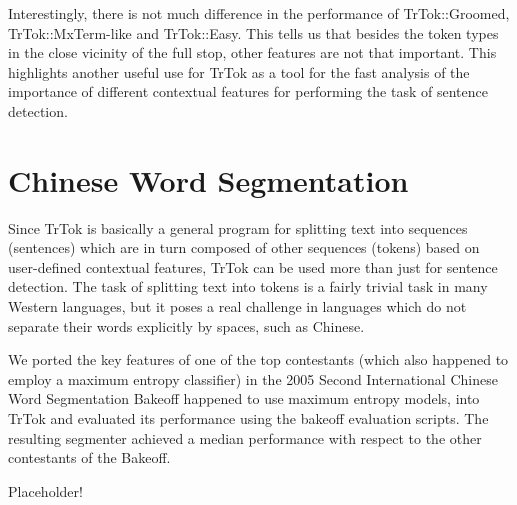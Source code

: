 Interestingly, there is not much difference in the performance of
TrTok::Groomed, TrTok::MxTerm-like and TrTok::Easy. This tells us that
besides the token types in the close vicinity of the full stop, other
features are not that important. This highlights another useful use
for TrTok as a tool for the fast analysis of the importance of
different contextual features for performing the task of sentence
detection.

\section{Chinese Word Segmentation}

Since TrTok is basically a general program for splitting text into
sequences (sentences) which are in turn composed of other sequences
(tokens) based on user-defined contextual features, TrTok can be used
more than just for sentence detection. The task of splitting text into
tokens is a fairly trivial task in many Western languages, but it
poses a real challenge in languages which do not separate their words
explicitly by spaces, such as Chinese.

We ported the key features of one of the top contestants (which also
happened to employ a maximum entropy classifier) in the 2005 Second
International Chinese Word Segmentation Bakeoff happened to use
maximum entropy models, into TrTok and evaluated its performance using
the bakeoff evaluation scripts. The resulting segmenter achieved a
median performance with respect to the other contestants of the
Bakeoff.

Placeholder!\cite{sbd-punkt}
